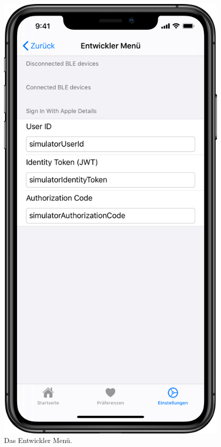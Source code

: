 \begin{minipage}{.45\textwidth}
	\begin{figure}[H]
		\centering
		\includegraphics[width=.68\textwidth]{./images/prototype/ios/dev.png}
		\caption{\label{fig:app:ios:dev}Das Entwickler Menü.}
	\end{figure}
\end{minipage}

